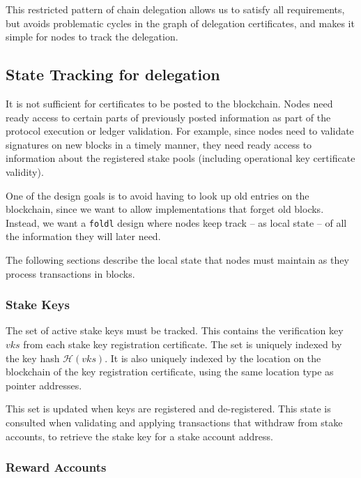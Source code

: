\documentclass[11pt,a4paper]{article}
\begin{document}
This restricted pattern of chain delegation allows us to satisfy all
requirements, but avoids problematic cycles in the graph of delegation
certificates, and makes it simple for nodes to track the delegation.

\subsection{State Tracking for delegation}
\label{state-tracking-for-delegation}

It is not sufficient for certificates to be posted to the blockchain.
Nodes need ready access to certain parts of previously posted
information as part of the protocol execution or ledger validation. For
example, since nodes need to validate signatures on new blocks in a
timely manner, they need ready access to information about the registered
stake pools (including operational key certificate validity).

One of the design goals is to avoid having to look up old entries on the
blockchain, since we want to allow implementations that forget old
blocks. Instead, we want a {\tt foldl} design where nodes keep track -- as
local state -- of all the information they will later need.

The following sections describe the local state that nodes must maintain
as they process transactions in blocks.

\subsubsection{Stake Keys}
\label{stake-keys}

The set of active stake keys must be tracked. This contains the
verification key \(vks\) from each stake key registration certificate.
The set is uniquely indexed by the key hash \(\mathcal{H}(vks)\). It is
also uniquely indexed by the location on the blockchain of the key
registration certificate, using the same location type as pointer
addresses.

This set is updated when keys are registered and de-registered. This
state is consulted when validating and applying transactions that
withdraw from stake accounts, to retrieve the stake key for a stake
account address.

\subsubsection{Reward Accounts}
\label{reward-accounts}
\end{document}
